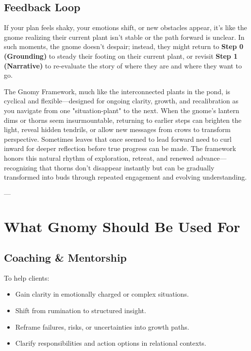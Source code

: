 \documentclass{article}
\begin{document}
\subsection{Feedback Loop}
If your plan feels shaky, your emotions shift, or new obstacles appear, it's like the gnome realizing their current plant isn't stable or the path forward is unclear. In such moments, the gnome doesn't despair; instead, they might return to \textbf{Step 0 (Grounding)} to steady their footing on their current plant, or revisit \textbf{Step 1 (Narrative)} to re-evaluate the story of where they are and where they want to go. 

The Gnomy Framework, much like the interconnected plants in the pond, is cyclical and flexible—designed for ongoing clarity, growth, and recalibration as you navigate from one "situation-plant" to the next. When the gnome's lantern dims or thorns seem insurmountable, returning to earlier steps can brighten the light, reveal hidden tendrils, or allow new messages from crows to transform perspective. Sometimes leaves that once seemed to lead forward need to curl inward for deeper reflection before true progress can be made. The framework honors this natural rhythm of exploration, retreat, and renewed advance—recognizing that thorns don't disappear instantly but can be gradually transformed into buds through repeated engagement and evolving understanding.

---

\section{What Gnomy Should Be Used For}

\subsection{Coaching \& Mentorship}
To help clients:
\begin{itemize}[noitemsep,topsep=0pt]
    \item Gain clarity in emotionally charged or complex situations.
    \item Shift from rumination to structured insight.
    \item Reframe failures, risks, or uncertainties into growth paths.
    \item Clarify responsibilities and action options in relational contexts.
\end{itemize}
\end{document}
